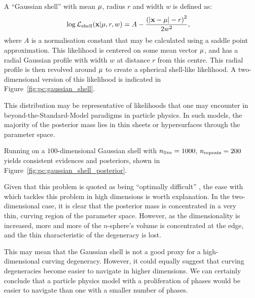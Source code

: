 A ``Gaussian shell'' with mean \(\mathbf{\mu}\), radius \(r\) and width \(w\) is defined as:
\begin{equation}
  \log\mathcal{L}_{\mathrm{shell}}(\mathbf{x}|\mathbf{\mu},r,w) = A - \frac{{\left(\left|\mathbf{x} - \mathbf{\mu}\right|- r\right)}^2}{2w^2},
  \label{eqn:pc:gaussian_shell}
\end{equation}
where \(A\) is a normalisation constant that may be calculated using a saddle point approximation.
This likelihood is centered on some mean vector \(\mathbf{\mu}\), and has a radial Gaussian profile with width \(w\) at distance \(r\) from this centre. This radial profile is then revolved around \(\mathbf{\mu}\) to create a spherical shell-like likelihood. A two-dimensional version of this likelihood is indicated in Figure~\ref{fig:pc:gaussian_shell}.

This distribution may be representative of likelihoods that one may encounter in beyond-the-Standard-Model paradigms in particle physics. In such models, the majority of the posterior mass lies in thin sheets or hypersurfaces through the parameter space.

Running \PolyChord{} on a \(100\)-dimensional Gaussian shell with \(n_{\mathrm{live}}=1000\), \(n_{\mathrm{repeats}}=200\) yields consistent evidences and posteriors, shown in Figure~\ref{fig:pc:gaussian_shell_posterior}. 
                                                                  
Given that this problem is quoted as being ``optimally difficult'' \citep{MultiNest2}, the ease with which \PolyChord{} tackles this problem in high dimensions is worth explanation. In the two-dimensional case, it is clear that the posterior mass is concentrated in a very thin, curving region of the parameter space. However, as the dimensionality is increased, more and more of the \(n\)-sphere's volume is concentrated at the edge, and the thin characteristic of the degeneracy is lost. 

This may mean that the Gaussian shell is not a good proxy for a high-dimensional curving degeneracy. However, it could equally suggest that curving degeneracies become easier to navigate in higher dimensions. We can certainly conclude that a particle physics model with a proliferation of phases would be easier to navigate than one with a smaller number of phases.


